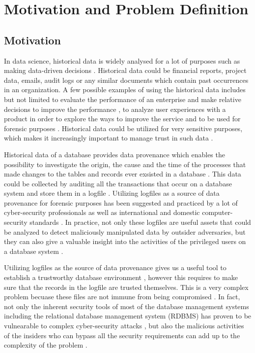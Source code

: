 \chapter{Motivation and Problem Definition} \label{ch:motivation}

	\section{Motivation} \label{sec:motivation}
		In data science, historical data is widely analysed for a lot of purposes such as making data-driven decisions \cite{rose2016datascience}. Historical data could be financial reports, project data, emails, audit logs or any similar documents which contain past occurrences in an organization. A few possible examples of using the historical data includes but not limited to evaluate the performance of an enterprise and make relative decisions to improve the performance \cite{ghasemaghaei2015impactsOB}, to analyze user experiences with a product in order to explore the ways to improve the service \cite{klein2013analysis} and to be used for forensic purposes \cite{wagner2018detect}. Historical data could be utilized for very sensitive purposes, which makes it increasingly important to manage trust in such data \cite{jain2013trustworthy}.

		Historical data of a database provides data provenance which enables the possibility to investigate the origin, the cause and the time of the processes that made changes to the tables and records ever exsisted in a database \cite{cheney2009provenance}. This data could be collected by auditing all the transactions that occur on a database system and store them in a logfile \cite{ghoshal2013provenance}. Utilizing logfiles as a source of data provenance for forensic purposes has been suggested and practiced by a lot of cyber-security professionals \cite{marty2011cloud}\cite{Patrascu2015logging}\cite{wagner2018detect}\cite{sinha2014continuous} as well as international and domestic computer-security standards \cite{ehealth3542}\cite{NIST2006}\cite{UBC2014} \cite{USDoD1985}. In practice, not only these logfiles are useful assets that could be analyzed to detect maliciously manipulated data by outsider adversaries, but they can also give a valuable insight into the activities of the privileged users on a database system \cite{sinha2014continuous}.

		Utilizing logfiles as the source of data provenance gives us a useful tool to establish a trustworthy database environment \cite{viglas2013DataProvenance}, however this requires to make sure that the records in the logfile are trusted themselves\cite{Dai2008anapproach}. This is a very complex problem becuase these files are not immune from being compromised \cite{wagner2018detect}\cite{lin2015secure}. In fact, not only the inherent security tools of most of the database management systems including the relational database management system (RDBMS) has proven to be vulnearable to complex cyber-security attacks \cite{wanger2017carving}, but also the malicious activities of the insiders who can bypass all the security requirements can add up to the complexity of the problem \cite{wagner2018detect}.

